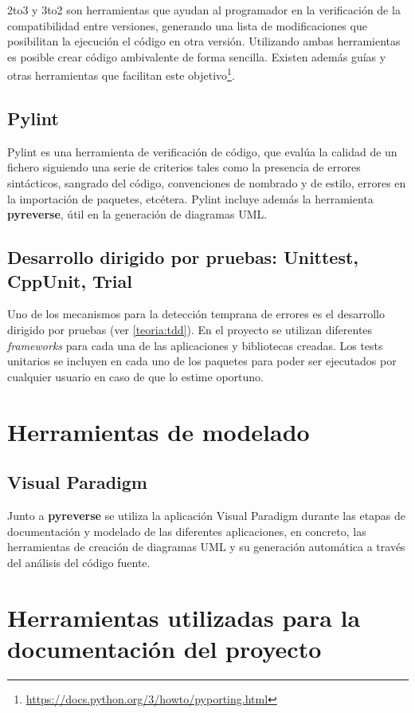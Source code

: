 2to3 y 3to2 son herramientas que ayudan al programador en la verificación de la compatibilidad entre versiones, generando una lista de modificaciones que posibilitan la ejecución el código en otra versión. Utilizando ambas herramientas es posible crear código ambivalente de forma sencilla. Existen además guías y otras herramientas que facilitan este objetivo\footnote{\href{https://docs.python.org/3/howto/pyporting.html}{https://docs.python.org/3/howto/pyporting.html}}.

\subsection{Pylint}

Pylint es una herramienta de verificación de código, que evalúa la calidad de un fichero siguiendo una serie de criterios tales como la presencia de errores sintácticos, sangrado del código, convenciones de nombrado y de estilo, errores en la importación de paquetes, etcétera. Pylint incluye además la herramienta \textbf{pyreverse}, útil en la generación de diagramas UML.

\subsection{Desarrollo dirigido por pruebas: Unittest, CppUnit, Trial}

Uno de los mecanismos para la detección temprana de errores es el desarrollo dirigido por pruebas (ver \ref{teoria:tdd}). En el proyecto se utilizan diferentes \textit{frameworks} para cada una de las aplicaciones y bibliotecas creadas. Los tests unitarios se incluyen en cada uno de los paquetes para poder ser ejecutados por cualquier usuario en caso de que lo estime oportuno.

\section{Herramientas de modelado}
\subsection{Visual Paradigm}

Junto a \textbf{pyreverse} se utiliza la aplicación Visual Paradigm durante las etapas de documentación y modelado de las diferentes aplicaciones, en concreto, las herramientas de creación de diagramas UML y su generación automática a través del análisis del código fuente.

\section{Herramientas utilizadas para la documentación del proyecto}

